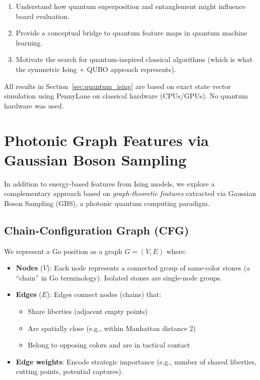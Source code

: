 \documentclass[aps,prl,reprint]{revtex4-2}
\begin{document}
\begin{enumerate}
	\item Understand how quantum superposition and entanglement might influence board evaluation.
	\item Provide a conceptual bridge to quantum feature maps in quantum machine learning.
	\item Motivate the search for quantum-inspired classical algorithms (which is what the symmetric Ising + QUBO approach represents).
\end{enumerate}

All results in Section~\ref{sec:quantum_ising} are based on exact state vector simulation using PennyLane on classical hardware (CPUs/GPUs). No quantum hardware was used.

\section{Photonic Graph Features via Gaussian Boson Sampling}
\label{sec:gbs}

In addition to energy-based features from Ising models, we explore a complementary approach based on \textit{graph-theoretic features} extracted via Gaussian Boson Sampling (GBS), a photonic quantum computing paradigm.

\subsection{Chain-Configuration Graph (CFG)}

We represent a Go position as a graph $G = (V, E)$ where:
\begin{itemize}
	\item \textbf{Nodes} ($V$): Each node represents a connected group of same-color stones (a ``chain'' in Go terminology). Isolated stones are single-node groups.
	\item \textbf{Edges} ($E$): Edges connect nodes (chains) that:
	\begin{itemize}
		\item Share liberties (adjacent empty points)
		\item Are spatially close (e.g., within Manhattan distance 2)
		\item Belong to opposing colors and are in tactical contact
	\end{itemize}
	\item \textbf{Edge weights}: Encode strategic importance (e.g., number of shared liberties, cutting points, potential captures).
\end{itemize}
\end{document}
